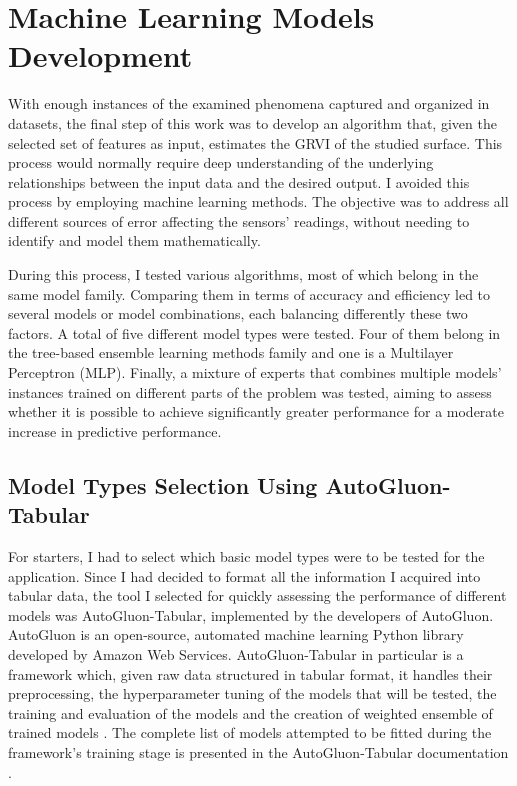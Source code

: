 \chapter{Machine Learning Models Development}
\label{chap7}

With enough instances of the examined phenomena captured and organized in datasets, the final step of this work was to develop an algorithm that, given the selected set of features as input, estimates the GRVI of the studied surface. This process would normally require deep understanding of the underlying relationships between the input data and the desired output. I avoided this process by employing machine learning methods. The objective was to address all different sources of error affecting the sensors' readings, without needing to identify and model them mathematically.

During this process, I tested various algorithms, most of which belong in the same model family. Comparing them in terms of accuracy and efficiency led to several models or model combinations, each balancing differently these two factors. A total of five different model types were tested. Four of them belong in the tree-based ensemble learning methods family and one is a Multilayer Perceptron (MLP). Finally, a mixture of experts that combines multiple models' instances trained on different parts of the problem was tested, aiming to assess whether it is possible to achieve significantly greater performance for a moderate increase in predictive performance.

\section{Model Types Selection Using AutoGluon-Tabular}

For starters, I had to select which basic model types were to be tested for the application. Since I had decided to format all the information I acquired into tabular data, the tool I selected for quickly assessing the performance of different models was AutoGluon-Tabular, implemented by the developers of AutoGluon. AutoGluon is an open-source, automated machine learning Python library developed by Amazon Web Services. AutoGluon-Tabular in particular is a framework which, given raw data structured in tabular format, it handles their preprocessing, the hyperparameter tuning of the models that will be tested, the training and evaluation of the models and the creation of weighted ensemble of trained models \cite{agtabular}. The complete list of models attempted to be fitted during the framework's training stage is presented in the AutoGluon-Tabular documentation \cite{autogluon_tabular_models_011}.

